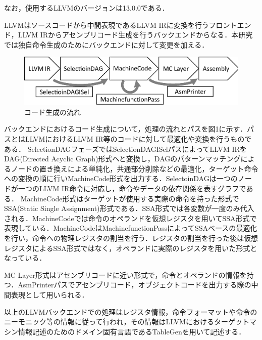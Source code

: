 \documentclass[a4paper,9pt, twocolumn]{jarticle}
\begin{document}
なお，使用するLLVMのバージョンは13.0.0である．

LLVMはソースコードから中間表現であるLLVM IRに変換を行うフロントエンド，LLVM IRからアセンブリコード生成を行うバックエンドからなる．本研究では独自命令生成のためにバックエンドに対して変更を加える．

\begin{figure}[t]
    \centering
    \includegraphics[scale=0.35]{backend_mojideka_2.eps}
    \vspace{-3truemm}
    \caption{コード生成の流れ}
    \vspace{-4truemm}
    \label{fig:backend}
\end{figure}

バックエンドにおけるコード生成について，処理の流れとパスを図1に示す．パスとはLLVMにおけるLLVM IR等のコードに対して最適化や変換を行うものである．
SelectionDAGフェーズではSelectionDAGISelパスによってLLVM IRをDAG(Directed Acyclic Graph)形式へと変換し，DAGのパターンマッチングによるノードの置き換えによる単純化，共通部分削除などの最適化，ターゲット命令への変換の順に行いMachineCode形式を出力する．SelectoinDAGは一つのノードが一つのLLVM IR命令に対応し，命令やデータの依存関係を表すグラフである．
MachineCode形式はターゲットが使用する実際の命令を持った形式でSSA(Static Single Assignment)形式である．SSA形式では各変数が一度のみ代入される．MachineCodeでは命令のオペランドを仮想レジスタを用いてSSA形式で表現している．MachineCodeはMachinefunctionPassによってSSAベースの最適化を行い，命令への物理レジスタの割当を行う．レジスタの割当を行った後は仮想レジスタによるSSA形式ではなく，オペランドに実際のレジスタを用いた形式となっている．

MC Layer形式はアセンブリコードに近い形式で，命令とオペランドの情報を持つ．AsmPrinterパスでアセンブリコード，オブジェクトコードを出力する際の中間表現として用いられる．

以上のLLVMバックエンドでの処理はレジスタ情報，命令フォーマットや命令のニーモニック等の情報に従って行われ，その情報はLLVMにおけるターゲットマシン情報記述のためのドメイン固有言語であるTableGenを用いて記述する．

\end{document}
